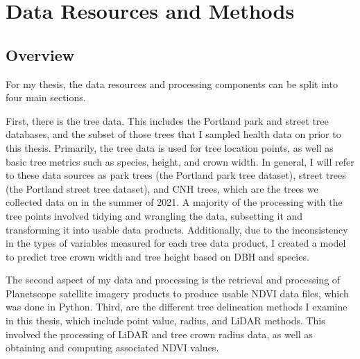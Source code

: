\documentclass[12pt,twoside]{reedthesis}
\begin{document}
\hypertarget{data-methods}{%
\chapter{Data Resources and Methods}\label{data-methods}}

\hypertarget{overview}{%
\section{Overview}\label{overview}}

For my thesis, the data resources and processing components can be split into four main sections.

First, there is the tree data. This includes the Portland park and street tree databases, and the subset of those trees that I sampled health data on prior to this thesis. Primarily, the tree data is used for tree location points, as well as basic tree metrics such as species, height, and crown width. In general, I will refer to these data sources as park trees (the Portland park tree dataset), street trees (the Portland street tree dataset), and CNH trees, which are the trees we collected data on in the summer of 2021. A majority of the processing with the tree points involved tidying and wrangling the data, subsetting it and transforming it into usable data products. Additionally, due to the inconsistency in the types of variables measured for each tree data product, I created a model to predict tree crown width and tree height based on DBH and species.

The second aspect of my data and processing is the retrieval and processing of Planetscope satellite imagery products to produce usable NDVI data files, which was done in Python. Third, are the different tree delineation methods I examine in this thesis, which include point value, radius, and LiDAR methods. This involved the processing of LiDAR and tree crown radius data, as well as obtaining and computing associated NDVI values.
\end{document}
